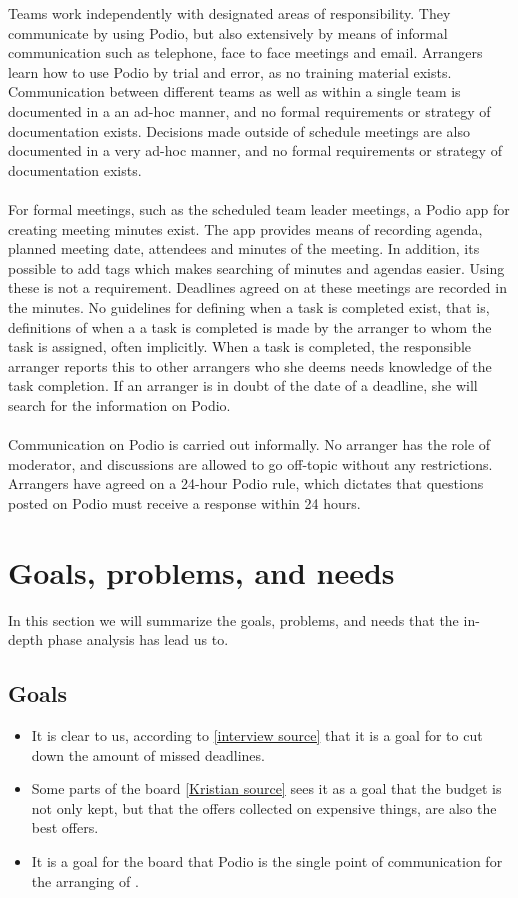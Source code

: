 Teams work independently with designated areas of responsibility. They communicate by using Podio, but also extensively by means of informal communication such as telephone, face to face meetings and email. Arrangers learn how to use Podio by trial and error, as no training material exists. Communication between different teams as well as within a single team is documented in a an ad-hoc manner, and no formal requirements or strategy of documentation exists. Decisions made outside of schedule meetings are also documented in a very ad-hoc manner, and no formal requirements or strategy of documentation exists.
\\ \\
For formal meetings, such as the scheduled team leader meetings, a Podio app for creating meeting minutes exist. The app provides means of recording agenda, planned meeting date, attendees and minutes of the meeting. In addition, its possible to add tags which makes searching of minutes and agendas easier. Using these is not a requirement. Deadlines agreed on at these meetings are recorded in the minutes. No guidelines for defining when a task is completed exist, that is, definitions of when a a task is completed is made by the arranger to whom the task is assigned, often implicitly. When a task is completed, the responsible arranger reports this to other arrangers who she deems needs knowledge of the task completion. If an arranger is in doubt of the date of a deadline, she will search for the information on Podio.
\\ \\
Communication on Podio is carried out informally. No arranger has the role of moderator, and discussions are allowed to go off-topic without any restrictions. Arrangers have agreed on a 24-hour Podio rule, which dictates that questions posted on Podio must receive a response within 24 hours.



\section{Goals, problems, and needs}
\label{sec:goprne}
In this section we will summarize the goals, problems, and needs that the
in-depth phase analysis has lead us to.

\subsection{Goals}
\label{subsec:goals}
\begin{itemize}
    \item It is clear to us, according to \ref{interview source} that it is a goal for \mil  to cut down
    the amount of missed deadlines.
    \item Some parts of the board \ref{Kristian source} sees it as a goal that the
    budget is not only kept, but that the offers collected on expensive things, are
    also the best offers.
    \item It is a goal for the board that Podio is the single point of communication
    for the arranging of \mil.
\end{itemize}

